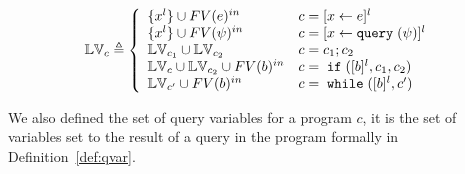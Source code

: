 \begin{defn}
\label{def:lvar}
{\footnotesize
$$
  \lvar_{c} \triangleq
  \left\{
  \begin{array}{ll}
      \{{x}^l\} \cup FV(\expr)^{in}                  
      & {c} = [{\assign x e}]^{l} 
      \\
      \{{x}^l\}   \cup FV(\qexpr)^{in}                
      & {c} = [{\assign x \query(\qexpr)}]^{l} 
      \\
      \lvar_{{c_1}} \cup \lvar_{{c_2}}  
      & {c} = {c_1};{c_2}
      \\
      \lvar_{{c}} \cup \lvar_{{c_2}} \cup FV(\bexpr)^{in}
      & {c} =\eif([\bexpr]^{l}, c_1, c_2) 
      \\
      \lvar_{{c}'} \cup FV(\bexpr)^{in}
      & {c}   = \ewhile ([\bexpr]^{l}, {c}')
\end{array}
\right.
$$
}
\end{defn}
%
%
%
We also defined the set of query variables for a program $c$,
it is the set of variables set to the result of a query in the program formally in Definition~\ref{def:qvar}.
%
